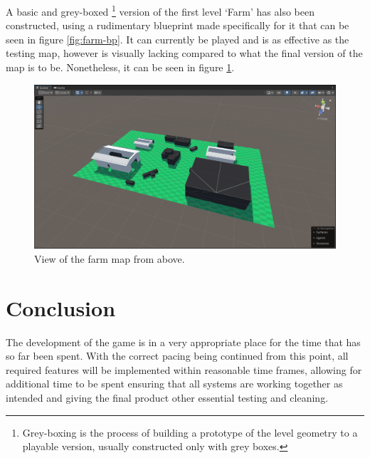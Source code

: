 \documentclass[11pt]{article}
\begin{document}
A basic and grey-boxed \footnote{Grey-boxing is the process of building a prototype of the level
geometry to a playable version, usually constructed only with grey boxes.} version of the first
level ‘Farm’ has also been constructed, using a rudimentary blueprint made specifically for it that
can be seen in figure \ref{fig:farm-bp}. It can currently be played and is as effective as the
testing map, however is visually lacking compared to what the final version of the map is to be.
Nonetheless, it can be seen in figure \ref{fig:farm-map}. \\

\begin{figure}[ht] 
    \centering
    \includegraphics[width=\columnwidth]{farm-map}
    \caption{View of the farm map from above.}
    \label{fig:farm-map}
\end{figure}

\section{Conclusion}
The development of the game is in a very appropriate place for the time that has so far been spent.
With the correct pacing being continued from this point, all required features will be implemented
within reasonable time frames, allowing for additional time to be spent ensuring that all systems
are working together as intended and giving the final product other essential testing and
cleaning. \\

\clearpage

\appendix
\end{document}
